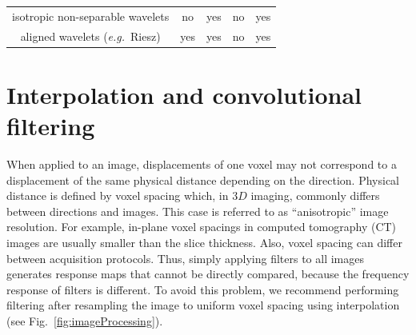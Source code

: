 \documentclass[fleqn,a4paper,oneside,openany]{book}
\begin{document}
\begin{table}
\begin{center}
\begin{tabular}{c|cccc|}
\begin{minipage}{50pt}\centering\vspace{3pt} isotropic non-separable wavelets \vspace{3pt}\end{minipage} & no & yes & no & yes \\
\begin{minipage}{50pt}\centering\vspace{3pt} aligned wavelets \hbox{(\textit{e.g.} Riesz)} \vspace{3pt}\end{minipage} & yes & yes & no & yes \\
\hline
\end{tabular}
\end{center}
\end{table}
%
\section{Interpolation and convolutional filtering}\label{sec:interpolationAndFiltering}
%

When applied to an image, displacements of one voxel may not correspond to a displacement of the same physical distance depending on the direction. 
Physical distance is defined by voxel spacing which, in 3$D$ imaging, commonly differs between directions and images. This case is referred to as ``anisotropic'' image resolution. For example, in-plane voxel spacings in computed tomography (CT) images are usually smaller than the slice thickness. Also, voxel spacing can differ between acquisition protocols. Thus, simply applying filters to all images generates response maps that cannot be directly compared, because the frequency response of filters is different. To avoid this problem, we recommend performing filtering after resampling the image to uniform voxel spacing using interpolation (see Fig.~\ref{fig:imageProcessing}).
\end{document}
